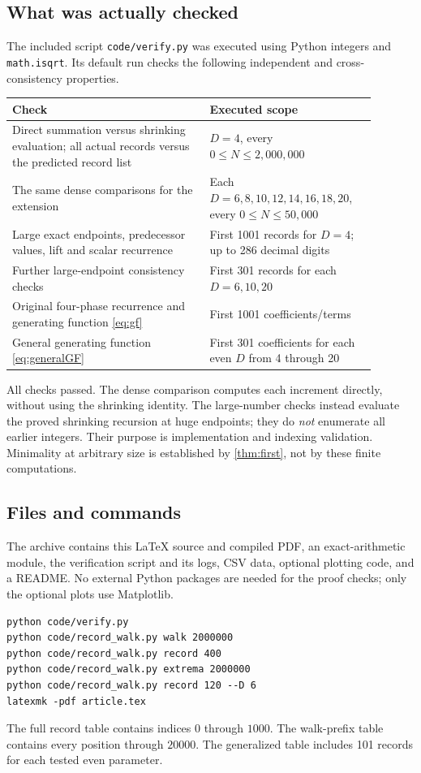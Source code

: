 \documentclass[11pt]{article}
\theoremstyle{definition}
\numberwithin{equation}{section}
\begin{document}
\subsection{What was actually checked}
The included script \texttt{code/verify.py} was executed using Python integers and \texttt{math.isqrt}. Its default run checks the following independent and cross-consistency properties.
\begin{center}
\begin{tabular}{p{0.49\linewidth}p{0.40\linewidth}}
\toprule
Check & Executed scope\\
\midrule
Direct summation versus shrinking evaluation; all actual records versus the predicted record list & $D=4$, every $0\le N\le2{,}000{,}000$\\[3pt]
The same dense comparisons for the extension & Each $D=6,8,10,12,14,16,18,20$, every $0\le N\le50{,}000$\\[3pt]
Large exact endpoints, predecessor values, lift and scalar recurrence & First 1001 records for $D=4$; up to 286 decimal digits\\[3pt]
Further large-endpoint consistency checks & First 301 records for each $D=6,10,20$\\[3pt]
Original four-phase recurrence and generating function \eqref{eq:gf} & First 1001 coefficients/terms\\[3pt]
General generating function \eqref{eq:generalGF} & First 301 coefficients for each even $D$ from 4 through 20\\
\bottomrule
\end{tabular}
\end{center}
All checks passed. The dense comparison computes each increment directly, without using the shrinking identity. The large-number checks instead evaluate the proved shrinking recursion at huge endpoints; they do \emph{not} enumerate all earlier integers. Their purpose is implementation and indexing validation. Minimality at arbitrary size is established by \cref{thm:first}, not by these finite computations.

\subsection{Files and commands}
The archive contains this \LaTeX{} source and compiled PDF, an exact-arithmetic module, the verification script and its logs, CSV data, optional plotting code, and a README. No external Python packages are needed for the proof checks; only the optional plots use Matplotlib.
\begin{lstlisting}
python code/verify.py
python code/record_walk.py walk 2000000
python code/record_walk.py record 400
python code/record_walk.py extrema 2000000
python code/record_walk.py record 120 --D 6
latexmk -pdf article.tex
\end{lstlisting}
The full record table contains indices $0$ through $1000$. The walk-prefix table contains every position through $20000$. The generalized table includes 101 records for each tested even parameter.
\end{document}
